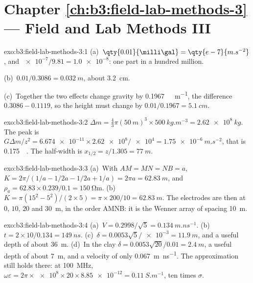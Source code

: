 \section*{Chapter \ref{ch:b3:field-lab-methods-3} --- Field and Lab Methods III}

\begin{solution}{exo:b3:field-lab-methods-3:1}
(a)~$\qty{0.01}{\milli\gal} = \qty{e-7}{m.s^{-2}}$, and
$\num{e-7}/\num{9.81} = \num{1.0e-8}$: one part in a hundred million.

(b)~$0.01/0.3086 = \qty{0.032}{m}$, about \qty{3.2}{cm}.

(c)~Together the two effects change gravity by
\qty{0.1967}{\milli\gal.m^{-1}}, the difference $0.3086 - 0.1119$, so
the height must change by $0.01/0.1967 = \qty{5.1}{cm}$.
\end{solution}

\begin{solution}{exo:b3:field-lab-methods-3:2}
$\Delta m = \tfrac43\pi(\qty{50}{m})^3\times\qty{500}{kg.m^{-3}} =
\qty{2.62e8}{kg}$. The peak is $G\Delta m/z^2 =
\num{6.674e-11}\times\num{2.62e8}/\num{e4} = \qty{1.75e-6}{m.s^{-2}}$,
that is \qty{0.175}{\milli\gal}. The half-width is $x_{1/2} = z/1.305 =
\qty{77}{m}$.
\end{solution}

\begin{solution}{exo:b3:field-lab-methods-3:3}
(a)~With $AM = MN = NB = a$, $K = 2\pi/(1/a - 1/2a - 1/2a + 1/a) =
2\pi a = \qty{62.83}{m}$, and $\rho_a = 62.83\times0.239/0.1 =
\qty{150}{\ohm\metre}$. (b)~$K = \pi(15^2 - 5^2)/(2\times5) = \pi\times
200/10 = \qty{62.83}{m}$. The electrodes are then at $0$, $10$, $20$
and \qty{30}{m}, in the order AMNB: it is the Wenner array of spacing
\qty{10}{m}.
\end{solution}

\begin{solution}{exo:b3:field-lab-methods-3:4}
(a)~$V = 0.2998/\sqrt5 = \qty{0.134}{m.ns^{-1}}$. (b)~$t =
2\times10/0.134 = \qty{149}{ns}$. (c)~$\delta = 0.0053\sqrt5/\num{e-3} =
\qty{11.9}{m}$, and a useful depth of about \qty{36}{m}. (d)~In the clay
$\delta = 0.0053\sqrt{20}/0.01 = \qty{2.4}{m}$, a useful depth of about
\qty{7}{m}, and a velocity of only \qty{0.067}{m.ns^{-1}}. The
approximation still holds there: at \qty{100}{MHz},
$\omega\varepsilon = 2\pi\times\num{e8}\times20\times\num{8.85e-12} =
\qty{0.11}{S.m^{-1}}$, ten times $\sigma$.
\end{solution}

